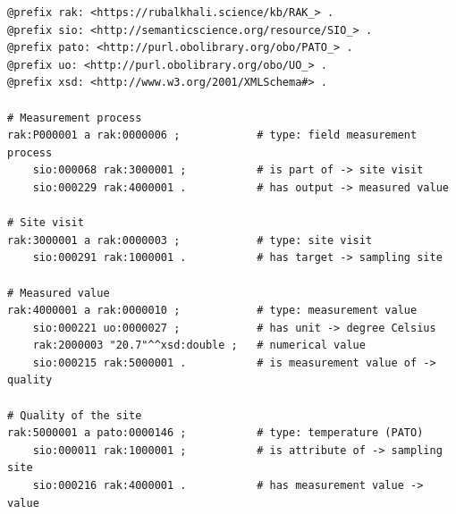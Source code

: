 \begin{revision}
\begin{lstlisting}[caption={Field temperature and its visit provenance.},label={lst:ttl_temp},basicstyle=\ttfamily\scriptsize,frame=single]
@prefix rak: <https://rubalkhali.science/kb/RAK_> .
@prefix sio: <http://semanticscience.org/resource/SIO_> .
@prefix pato: <http://purl.obolibrary.org/obo/PATO_> .
@prefix uo: <http://purl.obolibrary.org/obo/UO_> .
@prefix xsd: <http://www.w3.org/2001/XMLSchema#> .

# Measurement process
rak:P000001 a rak:0000006 ;            # type: field measurement process
    sio:000068 rak:3000001 ;           # is part of -> site visit
    sio:000229 rak:4000001 .           # has output -> measured value

# Site visit
rak:3000001 a rak:0000003 ;            # type: site visit
    sio:000291 rak:1000001 .           # has target -> sampling site

# Measured value
rak:4000001 a rak:0000010 ;            # type: measurement value
    sio:000221 uo:0000027 ;            # has unit -> degree Celsius
    rak:2000003 "20.7"^^xsd:double ;   # numerical value
    sio:000215 rak:5000001 .           # is measurement value of -> quality

# Quality of the site
rak:5000001 a pato:0000146 ;           # type: temperature (PATO)
    sio:000011 rak:1000001 ;           # is attribute of -> sampling site
    sio:000216 rak:4000001 .           # has measurement value -> value
\end{lstlisting}




\end{revision}
